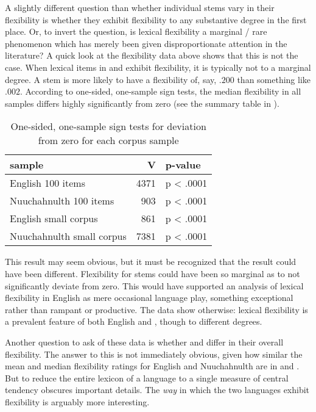 A slightly different question than whether individual stems vary in their flexibility is whether they exhibit flexibility to any substantive degree in the first place. Or, to invert the question, is lexical flexibility a marginal / rare phenomenon which has merely been given disproportionate attention in the literature? A quick look at the flexibility data above shows that this is not the case. When lexical items in  and  exhibit flexibility, it is typically not to a marginal degree. A stem is more likely to have a flexibility of, say, $.200$ than something like $.002$. According to one-sided, one-sample sign tests, the median flexibility in all samples differs highly significantly from zero (see the summary table in ).

\begin{table}
  \centering
  \caption{One-sided, one-sample sign tests for deviation from zero for each corpus sample}
  \label{tab:English-vs-Nuuchahnulth-median}
  \begin{tabular}{ l r l }
    \toprule
    sample                    & V    & p-value\\
    \midrule
    English 100 items         & 4371 & p < .0001\\
    Nuuchahnulth 100 items    & 903  & p < .0001\\
    English small corpus      & 861  & p < .0001\\
    Nuuchahnulth small corpus & 7381 & p < .0001\\
    \bottomrule
  \end{tabular}
\end{table}

This result may seem obvious, but it must be recognized that the result could have been different. Flexibility for  stems could have been so marginal as to not significantly deviate from zero. This would have supported an analysis of lexical flexibility in English as mere occasional language play, something exceptional rather than rampant or productive. The data show otherwise: lexical flexibility is a prevalent feature of both English and , though to different degrees.

Another question to ask of these data is whether  and  differ in their overall flexibility. The answer to this is not immediately obvious, given how similar the mean and median flexibility ratings for English and Nuuchahnulth are in  and . But to reduce the entire lexicon of a language to a single measure of central tendency obscures important details. The \emph{way} in which the two languages exhibit flexibility is arguably more interesting.

